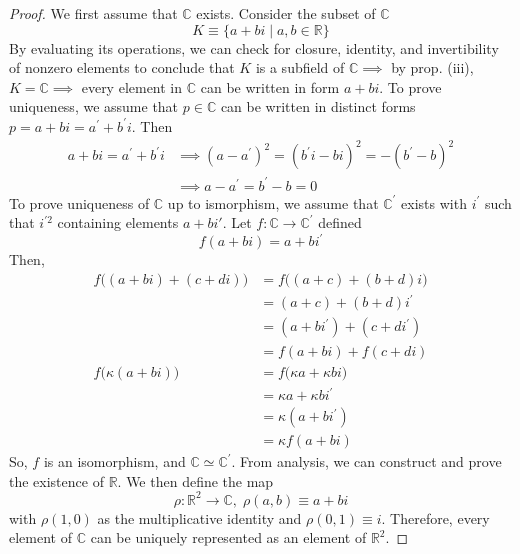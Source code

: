     \begin{proof}
      We first assume that $\mathbb{C}$ exists. Consider the subset of $\mathbb{C}$
      \begin{equation}
        K \equiv \{ a + bi \; | \; a, b \in \mathbb{R}\}
      \end{equation}
      By evaluating its operations, we can check for closure, identity, and invertibility of nonzero elements to conclude that $K$ is a subfield of $\mathbb{C} \implies$ by prop. (iii), $K = \mathbb{C} \implies$ every element in $\mathbb{C}$ can be written in form $a + bi$. To prove uniqueness, we assume that $p \in \mathbb{C}$ can be written in distinct forms $p = a + bi = a^{\prime} + b^\prime i$. Then
      \begin{align*}
         a + bi = a^{\prime} + b^\prime i & \implies (a - a^\prime)^2 = (b^\prime i - b i)^2 = - (b^\prime - b)^2 \\
         & \implies a - a^\prime = b^\prime - b = 0
      \end{align*}
      To prove uniqueness of $\mathbb{C}$ up to ismorphism, we assume that $\mathbb{C}^\prime$ exists with $i^\prime$ such that $i^{\prime 2}$ containing elements $a + b i'$. Let $f: \mathbb{C} \longrightarrow \mathbb{C}^\prime$ defined 
      \begin{equation}
        f( a + bi) = a + bi^\prime
      \end{equation}
      Then, 
      \begin{align*}
        f\big((a + b i) + (c + d i) \big) & = f\big( (a + c) + (b + d)i \big) \\
        & = (a + c) + (b + d) i^\prime \\
        & = (a + b i^\prime) + (c + d i^\prime) \\
        & = f(a + b i) + f( c + d i) \\
        f\big( \kappa (a + b i)\big) & = f\big( \kappa a + \kappa b i\big) \\
        & = \kappa a + \kappa b i^\prime \\
        & = \kappa (a + b i^\prime) \\
        & = \kappa f(a + b i)
      \end{align*}
      So, $f$ is an isomorphism, and $\mathbb{C} \simeq \mathbb{C}^\prime$. From analysis, we can construct and prove the existence of $\mathbb{R}$. We then define the map
      \begin{equation}
        \rho: \mathbb{R}^2 \longrightarrow \mathbb{C}, \; \rho(a, b) \equiv a + bi
      \end{equation}
      with $\rho(1, 0)$ as the multiplicative identity and $\rho(0,1) \equiv i$. Therefore, every element of $\mathbb{C}$ can be uniquely represented as an element of $\mathbb{R}^2$. 
    \end{proof}

